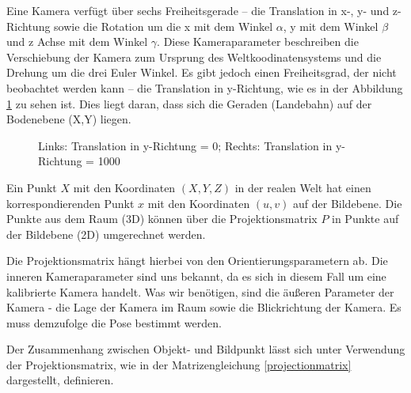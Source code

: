 \documentclass{ezb}
\begin{document}
Eine Kamera verfügt über sechs Freiheitsgerade – die Translation in x-, y- und z-Richtung sowie die Rotation um die x mit dem Winkel $\alpha$, y mit dem Winkel $\beta$ und z Achse mit dem Winkel $\gamma$. Diese Kameraparameter beschreiben die Verschiebung  der Kamera zum Ursprung des Weltkoodinatensystems und die Drehung um die drei Euler Winkel. Es gibt jedoch einen Freiheitsgrad, der nicht beobachtet werden kann – die Translation in y-Richtung, wie es in der Abbildung \ref{yTranslation} zu sehen ist. Dies liegt daran, dass sich die Geraden (Landebahn) auf der Bodenebene (X,Y) liegen.

\begin{figure}[htbp]
	\centering
	\caption{Links: Translation in y-Richtung = 0; Rechts: Translation in y-Richtung = 1000}
	\label{yTranslation}
\end{figure}

Ein Punkt $X$ mit den Koordinaten $(X,Y,Z)$ in der realen Welt hat einen korrespondierenden Punkt $x$ mit den Koordinaten $(u,v)$ auf der Bildebene. Die Punkte aus dem Raum (3D) können über die Projektionsmatrix $P$ in Punkte auf der Bildebene (2D) umgerechnet werden.

Die Projektionsmatrix hängt hierbei von den Orientierungsparametern ab. Die inneren Kameraparameter sind uns bekannt, da es sich in diesem Fall um eine kalibrierte Kamera handelt. Was wir benötigen, sind die äußeren Parameter der Kamera - die Lage der Kamera im Raum sowie die Blickrichtung der Kamera. Es muss demzufolge die Pose bestimmt werden.

Der Zusammenhang zwischen Objekt- und Bildpunkt lässt sich unter Verwendung der Projektionsmatrix, wie in der Matrizengleichung \ref{projectionmatrix} dargestellt, definieren.
\end{document}
